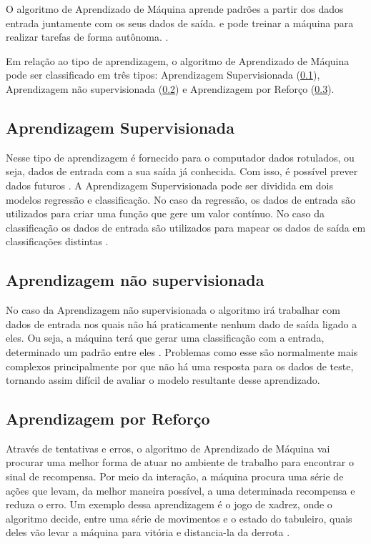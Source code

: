 O algoritmo de Aprendizado de Máquina aprende padrões a partir dos dados entrada juntamente com os seus dados de saída. e pode treinar a máquina para realizar tarefas de forma autônoma. \cite{diferencamachinelearning}.

Em relação ao tipo de aprendizagem, o algoritmo de Aprendizado de Máquina pode ser classificado em três tipos: Aprendizagem Supervisionada (\ref{aprendizadagem supervisionada}), Aprendizagem não supervisionada (\ref{Aprendizagem não supervisionada}) e Aprendizagem por Reforço (\ref{Aprendizagem por Reforço}).

\subsection{Aprendizagem Supervisionada}
\label{aprendizadagem supervisionada}
Nesse tipo de aprendizagem é fornecido para o computador dados rotulados, ou seja, dados de entrada com a sua saída já conhecida. Com isso, é possível prever dados futuros \cite{pythonmachinelearning}. 
A Aprendizagem Supervisionada pode ser dividida em dois modelos regressão e classificação. No caso da regressão, os dados de entrada são utilizados para criar uma função que gere um valor contínuo. No caso da classificação os dados de entrada são utilizados para mapear os dados de saída em classificações distintas \cite{pythonmachinelearning}. 

\subsection{Aprendizagem não supervisionada}
\label{Aprendizagem não supervisionada}
No caso da Aprendizagem não supervisionada o algoritmo irá trabalhar com dados de entrada nos quais não há praticamente nenhum dado de saída ligado a eles. Ou seja, a máquina terá que gerar uma classificação com a entrada, determinado um padrão entre eles \cite{pythonmachinelearning}. Problemas como esse são normalmente mais complexos principalmente por que não há uma resposta para os dados de teste, tornando assim difícil de avaliar o modelo resultante desse aprendizado.

\subsection{Aprendizagem por Reforço}
\label{Aprendizagem por Reforço}
Através de tentativas e erros, o algoritmo de Aprendizado de Máquina vai procurar uma melhor forma de atuar no ambiente de trabalho para encontrar o sinal de recompensa. Por meio da interação, a máquina procura uma série de ações que levam, da melhor maneira possível, a uma determinada recompensa e reduza o erro. Um exemplo dessa aprendizagem é o jogo de xadrez, onde o algoritmo decide, entre uma série de movimentos e o estado do tabuleiro, quais deles vão levar a máquina para vitória e distancia-la da derrota \cite{pythonmachinelearning}.

